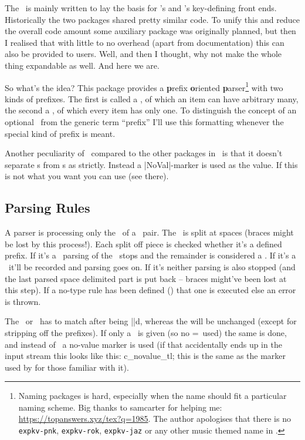 \genericekv{}

The \expkvp\ is mainly written to lay the basis for \expkvc's and \expkvd's
key-defining front ends. Historically the two packages shared pretty similar
code. To unify this and reduce the overall code amount some auxiliary package
was originally planned, but then I realised that with little to no overhead
(apart from documentation) this can also be provided to users. Well, and then I
thought, why not make the whole thing expandable as well. And here we are.

So what's the idea? This package provides a \textbf{p}refix \textbf{o}riented
\textbf{p}arser\footnote{Naming packages is hard, especially when the name
should fit a particular naming scheme. Big thanks to samcarter for helping
me: \url{https://topanswers.xyz/tex?q=1985}. The author apologises that there is
no \texttt{expkv-pnk}, \texttt{expkv-rok}, \texttt{expkv-jaz} or any other music
themed name in \expkvbundle.} with two kinds of prefixes. The first is called a
\prefix, of which an item can have arbitrary many, the second a \type, of which
every item has only one. To distinguish the concept of an optional \prefix\ from
the generic term \enquote{prefix} I'll use this formatting whenever the special
kind of prefix is meant.

Another peculiarity of \expkvp\ compared to the other packages in
\expkvbundle\ is that it doesn't separate \Nkey{}s from \Vkey{}s as
strictly. Instead a |NoVal|-marker is used as the value. If this is not what you
want you can use  (see there).


\subsection{Parsing Rules}

A parser is processing only the \key\ of a \kv\ pair. The \key\ is split at
spaces (braces might be lost by this process!). Each split off piece is checked
whether it's a defined prefix. If it's a \type\ parsing of the \key\ stops and
the remainder is considered a . If it's a \prefix\ it'll be recorded
and parsing goes on. If it's neither parsing is also stopped (and the last
parsed space delimited part is put back -- braces might've been lost at this
step). If a no-type rule has been defined () that one is
executed else an error is thrown.

The \prefix\ or \type\ has to match after being |\detokenize|d, whereas the
 will be unchanged (except for stripping off the prefixes). If only a
\key\ is given (so no =\val\ used) the same is done, and instead of \val\ a
no-value marker is used (if that accidentally ends up in the input stream this
looks like this: \csname c\string_novalue\string_tl\endcsname; this is the same
as the marker used by  for those familiar with it).

